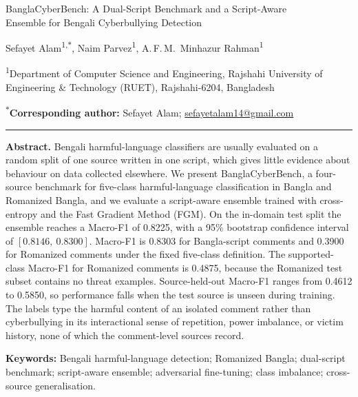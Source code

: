 \documentclass[11pt,a4paper]{article}
\def\texttt#1{#1}%
\def\emph#1{#1}%
\def\bfseries{}%
\def\sffamily{}%
\newcommand{\bench}{BanglaCyberBench}
\begin{document}
\thispagestyle{firstpage}

\vspace{0.5em}
{\RaggedRight\sffamily\bfseries\Large\color{black}%
\bench{}: A Dual-Script Benchmark and a Script-Aware\\[1pt]
Ensemble for Bengali Cyberbullying Detection\par}
\vspace{0.6em}

{Sefayet Alam\textsuperscript{1,$\ast$},\quad
Naim Parvez\textsuperscript{1},\quad
A.\,F.\,M.~Minhazur Rahman\textsuperscript{1}\par}
\vspace{0.3em}

{\textsuperscript{1}Department of Computer Science and Engineering,
Rajshahi University of Engineering \& Technology (RUET), Rajshahi-6204, Bangladesh\par}
\vspace{0.2em}

{\small\textsuperscript{$\ast$}\textbf{Corresponding author:} Sefayet Alam;
\href{mailto:sefayetalam14@gmail.com}{\texttt{sefayetalam14@gmail.com}}\par}

\vspace{0.5em}
{\color{abstractrule}\rule{\linewidth}{0.4pt}}
\vspace{0.3em}

\begin{journalabstract}
\noindent\textbf{Abstract.\;}%
Bengali harmful-language classifiers are usually evaluated on a random split of one source written in one script, which gives little evidence about behaviour on data collected elsewhere. We present \bench{}, a four-source benchmark for five-class harmful-language classification in Bangla and Romanized Bangla, and we evaluate a script-aware ensemble trained with cross-entropy and the Fast Gradient Method (FGM). On the in-domain test split the ensemble reaches a Macro-F1 of 0.8225, with a 95\% bootstrap confidence interval of $[0.8146,\ 0.8300]$. Macro-F1 is 0.8303 for Bangla-script comments and 0.3900 for Romanized comments under the fixed five-class definition. The supported-class Macro-F1 for Romanized comments is 0.4875, because the Romanized test subset contains no \emph{threat} examples. Source-held-out Macro-F1 ranges from 0.4612 to 0.5850, so performance falls when the test source is unseen during training. The labels type the harmful content of an isolated comment rather than cyberbullying in its interactional sense of repetition, power imbalance, or victim history, none of which the comment-level sources record.

\vspace{4pt}
\noindent\textbf{Keywords:}\; Bengali harmful-language detection;\; Romanized Bangla;\; dual-script benchmark;\; script-aware ensemble;\; adversarial fine-tuning;\; class imbalance;\; cross-source generalisation.
\end{journalabstract}
\end{document}
